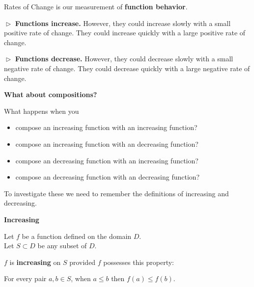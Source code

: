 \documentclass{ximera}
\begin{document}
Rates of Change is our measurement of \textbf{function behavior}.




$\vartriangleright$  \textbf{\textcolor{blue!55!black}{Functions increase.}}  However, they could increase slowly with a small positive rate of change.  They could increase quickly with a large positive rate of change. 



$\vartriangleright$  \textbf{\textcolor{blue!55!black}{Functions decrease.}}  However, they could decrease slowly with a small negative rate of change.  They could decrease quickly with a large negative rate of change. 





\textbf{\textcolor{purple!85!blue}{What about compositions?}}





What happens when you


\begin{itemize}
\item compose an increasing function with an increasing function?
\item compose an increasing function with an decreasing function?
\item compose an decreasing function with an increasing function?
\item compose an decreasing function with an decreasing function?
\end{itemize}



To investigate these we need to remember the definitions of increasing and decreasing.






\begin{summary} \textbf{\textcolor{green!50!black}{Increasing}} 


Let $f$ be a function defined on the domain $D$. \\
Let $S \subset D$ be any subset of $D$.

$f$ is \textbf{increasing} on $S$ provided $f$ possesses this property:  


\begin{center}
For every pair $a, b \in S$, when $a \leq b$ then $f(a) \leq f(b)$.
\end{center}

\end{summary}
\end{document}
